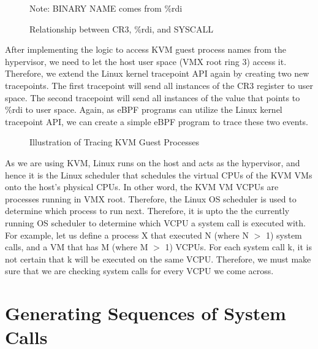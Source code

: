 \documentclass{report}
\begin{document}
\begin{spacing}{1.5}
\begin{figure}[ht]
    \hspace*{-2cm}  
    \centering
    \caption{Relationship between CR3, \%rdi, and SYSCALL}{Note: BINARY NAME comes from \%rdi}
\end{figure}


{\large
\noindent After implementing the logic to access KVM guest process names from the hypervisor, we need to let the host user space (VMX root ring 3) access it. Therefore, we extend the Linux kernel tracepoint API again by creating two new tracepoints. The first tracepoint will send all instances of the CR3 register to user space. The second tracepoint will send all instances of the value that points to \%rdi to user space. Again, as eBPF programs can utilize the Linux kernel tracepoint API, we can create a simple eBPF program to trace these two events.  
\newline
}



\begin{figure}[ht]
\centering
  \caption{Illustration of Tracing KVM Guest Processes}
\end{figure}




{\large
\noindent As we are using KVM, Linux runs on the host and acts as the hypervisor, and hence it is the Linux scheduler that schedules the virtual CPUs of the KVM VMs onto the host's physical CPUs. In other word, the KVM VM VCPUs are processes running in VMX root. Therefore, the Linux OS scheduler is used to determine which process to run next. Therefore, it is upto the the currently running OS scheduler to determine which VCPU a system call is executed with. For example, let us define a process X that executed N (where N $>$ 1) system calls, and a VM that has M (where M $>$ 1) VCPUs. For each system call k, it is not certain that k will be executed on the same VCPU. Therefore, we must make sure that we are checking system calls for every VCPU we come across.
\leavevmode\newline
}


\section{Generating Sequences of System Calls}


\end{spacing}
\end{document}
